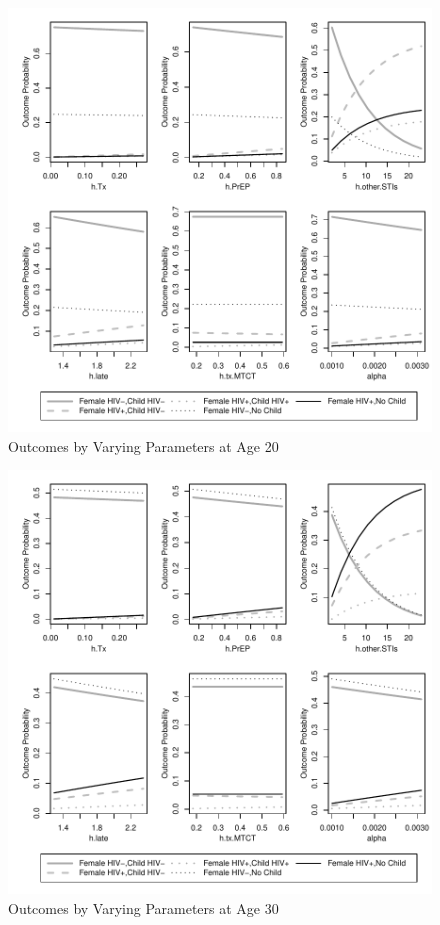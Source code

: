 \documentclass[11pt]{nih_mod}
\begin{document}
\begin{figure}[!h]
  \begin{center}
    \includegraphics[width=5in]{figures/OnlyVaryParam_Age20_06Sept2012.pdf}
  \end{center}
  \caption{Outcomes by Varying Parameters at Age 20}
  \label{Fig:Vary20}
\end{figure}

\begin{figure}[!h]
  \begin{center}
    \includegraphics[width=5in]{figures/OnlyVaryParam_Age30_06Sept2012.pdf}
  \end{center}
  \caption{Outcomes by Varying Parameters at Age 30}
  \label{Fig:Vary30}
\end{figure}
\end{document}
